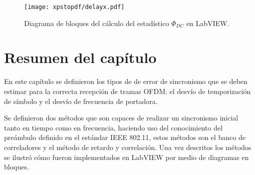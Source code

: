 \begin{figure}[t]
    \centering{}\texttt{[image: xpstopdf/delayx.pdf]}
    \caption{Diagrama de bloques del cálculo del estadístico $\Phi_{DC}$ en LabVIEW.\label{fig:delayx_lv}}  
\end{figure}


\section{Resumen del capítulo}

En este capítulo se definieron los tipos de de error de sincronismo que se deben estimar para la correcta recepción de tramas OFDM: el desvío de temporización de símbolo y el desvío de frecuencia de portadora. 

Se definieron dos métodos que son capaces de realizar un sincronismo inicial tanto en tiempo como en frecuencia, haciendo uso del conocimiento del preámbulo definido en el estándar IEEE 802.11, estos métodos son el banco de correladores y el método de retardo y correlación. Una vez descritos los métodos se ilustró cómo fueron implementados en LabVIEW por medio de diagramas en bloques. 

